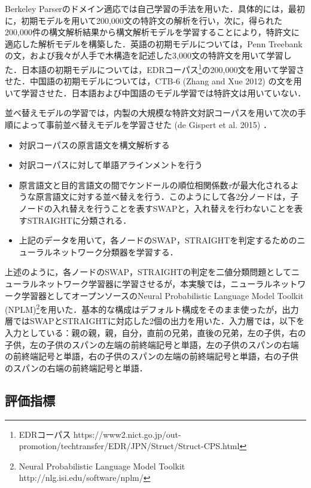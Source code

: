 \documentclass[japanese]{jnlp_1.4}
\begin{document}
Berkeley 
Parserのドメイン適応では自己学習の手法を用いた．具体的には，最初に，初期モデルを用いて200,000文の特許文の解析を行い，次に，得られた200,000件の構文解析結果から構文解析モデルを学習することにより，特許文に適応した解析モデルを構築した．英語の初期モデルについては，Penn 
Treebankの文，および我々が人手で木構造を記述した3,000文の特許文を用いて学習した．日本語の初期モデルについては，EDRコーパス\footnote{EDRコーパス https://www2.nict.go.jp/out-promotion/techtransfer/EDR/JPN/Struct/Struct-CPS.html}の200,000文を用いて学習させた．中国語の初期モデルについては，CTB-6 (Zhang 
and Xue 
2012) の文を用いて学習させた．日本語および中国語のモデル学習では特許文は用いていない．

並べ替えモデルの学習では，内製の大規模な特許文対訳コーパスを用いて次の手順によって事前並べ替えモデルを学習させた (de 
Gispert et al. 2015) ．

\begin{itemize}
\item[1.] 対訳コーパスの原言語文を構文解析する
\item[2.] 対訳コーパスに対して単語アラインメントを行う
\item[3.] 原言語文と目的言語文の間でケンドールの順位相関係数$\tau $が最大化されるような原言語文に対する並べ替えを行う．このようにして各2分ノードは，子ノードの入れ替えを行うことを表すSWAPと，入れ替えを行わないことを表すSTRAIGHTに分類される．
\item[4.] 上記のデータを用いて，各ノードのSWAP，STRAIGHTを判定するためのニューラルネットワーク分類器を学習する．
\end{itemize}

上述のように，各ノードのSWAP，STRAIGHTの判定を二値分類問題としてニューラルネットワーク学習器に学習させるが，本実験では，ニューラルネットワーク学習器としてオープンソースのNeural 
Probabilistic Language Model Toolkit (NPLM)\footnote{Neural Probabilistic Language Model Toolkit http://nlg.isi.edu/software/nplm/}を用いた．基本的な構成はデフォルト構成をそのまま使ったが，出力層ではSWAPとSTRAIGHTに対応した2個の出力を用いた．入力層では，以下を入力としている：親の親，親，自分，直前の兄弟，直後の兄弟，左の子供，右の子供，左の子供のスパンの左端の前終端記号と単語，左の子供のスパンの右端の前終端記号と単語，右の子供のスパンの左端の前終端記号と単語，右の子供のスパンの右端の前終端記号と単語．


\subsection{評価指標}
\end{document}
